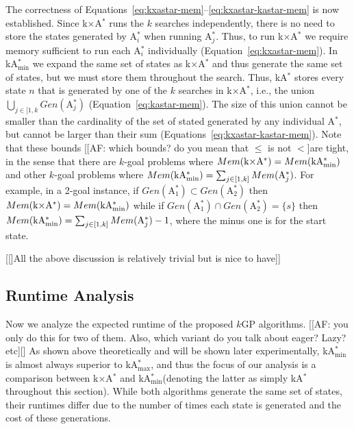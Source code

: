 \documentclass[twoside,11pt]{article}
\newcommand{\kgs}{$k$GP\xspace}
\newcommand{\astar}{A$^*$\xspace}
\newcommand{\kastar}{kA$^*$\xspace}
\newcommand{\kastarvar}[1]{\textup{kA}$^*_{#1}$\xspace}
\newcommand{\kastarmin}{\kastarvar{\min}}
\newcommand{\kastarmax}{\kastarvar{\max}}
\newcommand{\kxastar}{k$\times$A$^*$\xspace}
\newcommand{\astari}[1]{A$^*_#1$\xspace}
\begin{document}
The correctness of Equations~\eqref{eq:kxastar-mem}--\eqref{eq:kxastar-kastar-mem} is now established.
Since \kxastar runs the $k$ searches independently, there is no need to store the states generated by \astari{i} when running \astari{j}.
Thus, to run \kxastar we require memory sufficient to run each \astari{i} individually (Equation~\eqref{eq:kxastar-mem}).
In \kastarmin we expand the same set of states as \kxastar and thus generate the same set of states, but we must store them throughout the search.
Thus, \kastar stores every state $n$ that is  generated by one of the $k$ searches in \kxastar, i.e., the union $\bigcup_{j\in[1,k}Gen(\text{\astari{j}})$ (Equation~\eqref{eq:kastar-mem}).
The size of this union cannot be smaller than the cardinality of the set of stated generated by any individual \astar, but cannot be larger than their sum (Equations~\eqref{eq:kxastar-kastar-mem}).
Note that these bounds [[AF: which bounds? do you mean that $\leq$ is not $<$]are tight, in the sense that there are $k$-goal problems where $Mem(\text{\kxastar}) = Mem(\text{\kastarmin})$ and other $k$-goal problems where $Mem(\text{\kastarmin}) = \sum_{j\in[1,k]} Mem(\text{\astari{j}})$.
For example, in a 2-goal instance, if $Gen(\text{\astari{1}})\subset Gen(\text{\astari{2}})$ then $Mem(\text{\kxastar}) = Mem(\text{\kastarmin})$ while if $Gen(\text{\astari{1}})\cap Gen(\text{\astari{2}})=\{s\}$ then $Mem(\text{\kastarmin}) = \sum_{j\in[1,k]} Mem(\text{\astari{j}})-1$, where the minus one is for the start state. %

[[]All the above discussion is relatively trivial but is nice to have]]


\subsection{Runtime Analysis}

Now we analyze the expected runtime of the proposed \kgs algorithms. [[AF: you only do this for two of them. Also, which variant do you talk about eager? Lazy? etc][]
As shown above theoretically and will be shown later experimentally, \kastarmin is almost always superior to \kastarmax, and thus the focus of our analysis is a comparison between \kxastar and \kastarmin (denoting the latter as simply \kastar throughout this section). 
While both algorithms generate the same set of states, %
their runtimes differ due to the number of times each state is generated and the cost of these generations.
\end{document}
